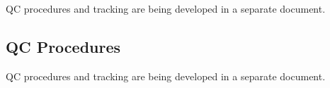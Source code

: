 
QC procedures and tracking are being developed in a separate document.

\subsection{QC Procedures}
QC procedures and tracking are being developed in a separate document.


